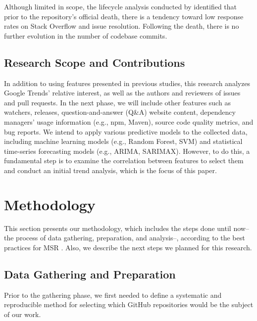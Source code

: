 \documentclass[10pt,conference,peerreview]{IEEEtran}
\begin{document}

Although limited in scope, the lifecycle analysis conducted by \cite{soupinski2022} identified that prior to the repository's official death, there is a tendency toward low response rates on Stack Overflow and issue resolution. Following the death, there is no further evolution in the number of codebase commits.

\subsection{Research Scope and Contributions}
In addition to using features presented in previous studies, this research analyzes Google Trends' relative interest, as well as the authors and reviewers of issues and pull requests. In the next phase, we will include other features such as watchers, releases, question-and-answer (Q\&A) website content, dependency managers' usage information (e.g., npm, Maven), source code quality metrics, and bug reports. We intend to apply various predictive models to the collected data, including machine learning models (e.g., Random Forest, SVM) and statistical time-series forecasting models (e.g., ARIMA, SARIMAX). However, to do this, a fundamental step is to examine the correlation between features to select them and conduct an initial trend analysis, which is the focus of this paper.

\section{Methodology}
\label{sec:methodology}
This section presents our methodology, which includes the steps done until now--the process of data gathering, preparation, and analysis--, according to the best practices for MSR \cite{cookbook}. Also, we describe the next steps we planned for this research.

\subsection{Data Gathering and Preparation}
\label{gathering}
Prior to the gathering phase, we first needed to define a systematic and reproducible method for selecting which GitHub repositories would be the subject of our work.
\end{document}
